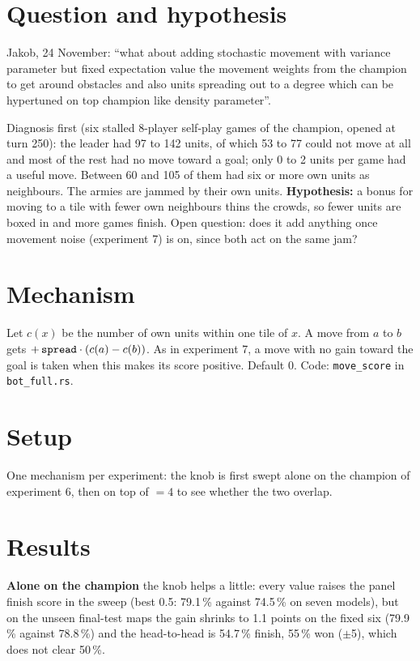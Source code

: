 \documentclass{../polyexp}
\begin{document}

\ExpHeader

\section{Question and hypothesis}
Jakob, 24 November: ``what about adding stochastic movement with variance parameter but fixed expectation value the movement weights from the champion to get around obstacles and also units spreading out to a degree which can be hypertuned on top champion like density parameter''.

Diagnosis first (six stalled 8-player self-play games of the champion, opened at turn 250): the leader had 97 to 142 units, of which 53 to 77 could not move at all and most of the rest had no move toward a goal; only 0 to 2 units per game had a useful move. Between 60 and 105 of them had six or more own units as neighbours. The armies are jammed by their own units. \textbf{Hypothesis:} a bonus for moving to a tile with fewer own neighbours thins the crowds, so fewer units are boxed in and more games finish. Open question: does it add anything once movement noise (experiment 7) is on, since both act on the same jam?

\section{Mechanism}
Let $c(x)$ be the number of own units within one tile of $x$. A move from $a$ to $b$ gets $+\,\texttt{spread}\cdot(c(a)-c(b))$. As in experiment 7, a move with no gain toward the goal is taken when this makes its score positive. Default 0. Code: \texttt{move\_score} in \texttt{bot\_full.rs}.

\section{Setup}
One mechanism per experiment: the knob is first swept alone on the champion of experiment 6, then on top of  $=4$ to see whether the two overlap.

\section{Results}
\ExpResults

\textbf{Alone on the champion} the knob helps a little: every value raises the panel finish score in the sweep (best 0.5: 79.1\,\% against 74.5\,\% on seven models), but on the unseen final-test maps the gain shrinks to 1.1 points on the fixed six (79.9\,\% against 78.8\,\%) and the head-to-head is 54.7\,\% finish, 55\,\% won ($\pm$5), which does not clear 50\,\%.
\end{document}
